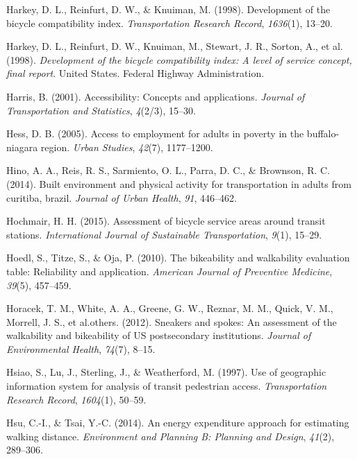 \documentclass[
11pt, %
oneside, %
english, %
singlespacing, %
]{macthesis} %
\newlength{\cslhangindent}
\newenvironment{CSLReferences}[2] %
{\begin{list}{}{%
	\setlength{\itemindent}{0pt}
	\setlength{\leftmargin}{0pt}
	\setlength{\parsep}{0pt}
	\ifodd #1
	\setlength{\leftmargin}{\cslhangindent}
	\setlength{\itemindent}{-1\cslhangindent}
	\fi
	\setlength{\itemsep}{#2\baselineskip}}}
{\end{list}}
\begin{document}
\begin{CSLReferences}{1}{0}
Harkey, D. L., Reinfurt, D. W., \& Knuiman, M. (1998). Development of the bicycle compatibility index. \emph{Transportation Research Record}, \emph{1636}(1), 13--20.

Harkey, D. L., Reinfurt, D. W., Knuiman, M., Stewart, J. R., Sorton, A., et al. (1998). \emph{Development of the bicycle compatibility index: A level of service concept, final report}. United States. Federal Highway Administration.

Harris, B. (2001). Accessibility: Concepts and applications. \emph{Journal of Transportation and Statistics}, \emph{4}(2/3), 15--30.

Hess, D. B. (2005). Access to employment for adults in poverty in the buffalo-niagara region. \emph{Urban Studies}, \emph{42}(7), 1177--1200.

Hino, A. A., Reis, R. S., Sarmiento, O. L., Parra, D. C., \& Brownson, R. C. (2014). Built environment and physical activity for transportation in adults from curitiba, brazil. \emph{Journal of Urban Health}, \emph{91}, 446--462.

Hochmair, H. H. (2015). Assessment of bicycle service areas around transit stations. \emph{International Journal of Sustainable Transportation}, \emph{9}(1), 15--29.

Hoedl, S., Titze, S., \& Oja, P. (2010). The bikeability and walkability evaluation table: Reliability and application. \emph{American Journal of Preventive Medicine}, \emph{39}(5), 457--459.

Horacek, T. M., White, A. A., Greene, G. W., Reznar, M. M., Quick, V. M., Morrell, J. S., et al.others. (2012). Sneakers and spokes: An assessment of the walkability and bikeability of US postsecondary institutions. \emph{Journal of Environmental Health}, \emph{74}(7), 8--15.

Hsiao, S., Lu, J., Sterling, J., \& Weatherford, M. (1997). Use of geographic information system for analysis of transit pedestrian access. \emph{Transportation Research Record}, \emph{1604}(1), 50--59.

Hsu, C.-I., \& Tsai, Y.-C. (2014). An energy expenditure approach for estimating walking distance. \emph{Environment and Planning B: Planning and Design}, \emph{41}(2), 289--306.


\end{CSLReferences}
\end{document}
